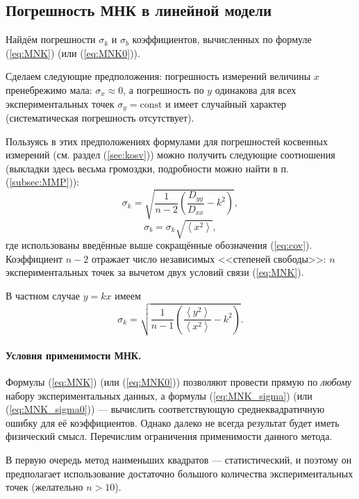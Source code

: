 \subsection{Погрешность МНК в линейной модели}

Найдём погрешности $\sigma_{k}$ и $\sigma_{b}$ коэффициентов, вычисленных
по формуле (\ref{eq:MNK}) (или (\ref{eq:MNK0})).

Сделаем следующие предположения: погрешность измерений величины $x$
пренебрежимо мала: $\sigma_{x}\approx0$, а погрешность по $y$ одинакова
для всех экспериментальных точек $\sigma_{y}=\mathrm{const}$ и имеет
случайный характер (систематическая погрешность отсутствует).

Пользуясь в этих предположениях формулами для погрешностей косвенных
измерений (см. раздел (\ref{sec:kosv})) можно получить следующие
соотношения (выкладки здесь весьма громоздки, подробности можно найти
в п. (\ref{subsec:MMP})):
\begin{equation}
\sigma_{k}=\sqrt{\frac{1}{n-2}\left(\frac{D_{yy}}{D_{xx}}-k^{2}\right)},\label{
eq:MNK_sigma}
\end{equation}
\begin{equation}
\sigma_{b}=\sigma_{k}\sqrt{\left\langle x^{2}\right\rangle
},\label{eq:MNK_sigma_b}
\end{equation}
где использованы введённые выше сокращённые обозначения (\ref{eq:cov}).
Коэффициент $n-2$ отражает число независимых <<степеней
свободы>>: $n$ экспериментальных точек за вычетом двух
условий связи (\ref{eq:MNK}).

В частном случае $y=kx$ имеем
\begin{equation}
\sigma_{k}=\sqrt{\frac{1}{n-1}\left(\frac{\left\langle y^{2}\right\rangle
}{\left\langle x^{2}\right\rangle }-k^{2}\right)}.\label{eq:MNK_sigma0}
\end{equation}


\paragraph{Условия применимости МНК.}

Формулы (\ref{eq:MNK}) (или (\ref{eq:MNK0})) позволяют провести
прямую по \emph{любому} набору экспериментальных данных, а формулы
(\ref{eq:MNK_sigma}) (или (\ref{eq:MNK_sigma0})) --- вычислить
соответствующую среднеквадратичную ошибку для её коэффициентов. Однако
далеко не всегда результат будет иметь физический смысл. Перечислим
ограничения применимости данного метода.

В первую очередь метод наименьших квадратов --- статистический,
и поэтому он предполагает использование достаточно большого количества
экспериментальных точек (желательно $n>10$).

